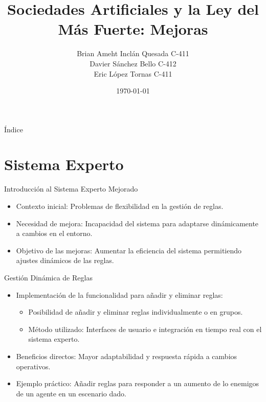\documentclass{beamer}
\title{Sociedades Artificiales y la Ley del Más Fuerte: Mejoras}
\author{Brian Ameht Inclán Quesada C-411 \\ Davier Sánchez Bello C-412 \\ Eric López Tornas C-411}
\date{\today}
\begin{document}
\begin{frame}
    \titlepage
\end{frame}

\begin{frame}{Índice}
    \tableofcontents
\end{frame}

\section{Sistema Experto}

\begin{frame}{Introducción al Sistema Experto Mejorado}
    \begin{itemize}
        \item Contexto inicial: Problemas de flexibilidad en la gestión de reglas.
        \item Necesidad de mejora: Incapacidad del sistema para adaptarse dinámicamente a cambios en el entorno.
        \item Objetivo de las mejoras: Aumentar la eficiencia del sistema permitiendo ajustes dinámicos de las reglas.
    \end{itemize}
\end{frame}

\begin{frame}{Gestión Dinámica de Reglas}
    \begin{itemize}
        \item Implementación de la funcionalidad para añadir y eliminar reglas:
              \begin{itemize}
                  \item Posibilidad de añadir y eliminar reglas individualmente o en grupos.
                  \item Método utilizado: Interfaces de usuario e integración en tiempo real con el sistema experto.
              \end{itemize}
        \item Beneficios directos: Mayor adaptabilidad y respuesta rápida a cambios operativos.
        \item Ejemplo práctico: Añadir reglas para responder a un aumento de lo enemigos de un agente en un escenario dado.
    \end{itemize}
\end{frame}
\end{document}
